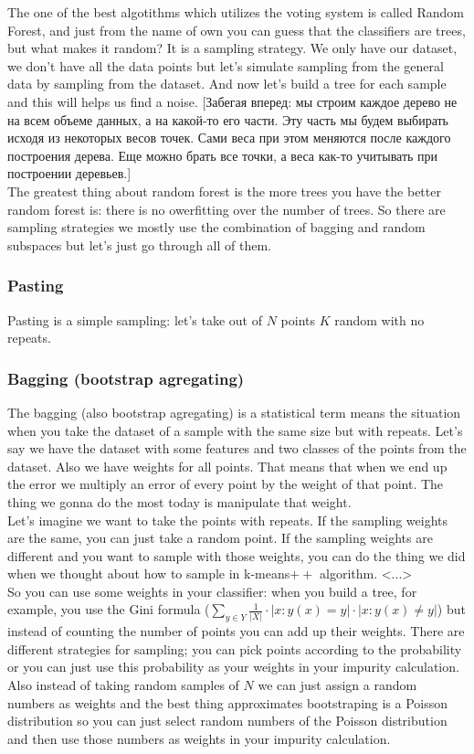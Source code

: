 The one of the best algotithms which utilizes the voting system is called Random Forest, and just from the name of own you can guess that the classifiers are trees, but what makes it random? It is a sampling strategy. We only have our dataset, we don't have all the data points but let's simulate sampling from the general data by sampling from the dataset. And now let's build a tree for each sample and this will helps us find a noise. [Забегая вперед: мы строим каждое дерево не на всем объеме данных, а на какой-то его части. Эту часть мы будем выбирать исходя из некоторых весов точек. Сами веса при этом меняются после каждого построения дерева. Еще можно брать все точки, а веса как-то учитывать при построении деревьев.]\\
The greatest thing about random forest is the more trees you have the better random forest is: there is no owerfitting over the number of trees. So there are sampling strategies we mostly use the combination of bagging and random subspaces but let's just go through all of them.

\subsubsection*{Pasting}

Pasting is a simple sampling: let's take out of $N$ points $K$ random with no repeats.

\subsubsection*{Bagging (bootstrap agregating)}

The bagging (also bootstrap agregating) is a statistical term means the situation when you take the dataset of a sample with the same size but with repeats. Let's say we have the dataset with some features and two classes of the points from the dataset. Also we have weights for all points. That means that when we end up the error we multiply an error of every point by the weight of that point. The thing we gonna do the most today is manipulate that weight. \\
Let's imagine we want to take the points with repeats. If the sampling weights are the same, you can just take a random point. If the sampling weights are different and you want to sample with those weights, you can do the thing we did when we thought about how to sample in k-means$++$ algorithm. <...> \\
So you can use some weights in your classifier: when you build a tree, for example, you use the Gini formula ($\sum_{y\in Y}\frac{1}{|X|}\cdot|x: y(x) =y|\cdot|x: y(x) \ne y|$) but instead of counting the number of points you can add up their weights. There are different strategies for sampling; you can pick points according to the probability or you can just use this probability as your weights in your impurity calculation. Also instead of taking random samples of $N$ we can just assign a random numbers as weights and the best thing approximates bootstraping is a Poisson distribution so you can just select random numbers of the Poisson distribution and then use those numbers as weights in your impurity calculation.

